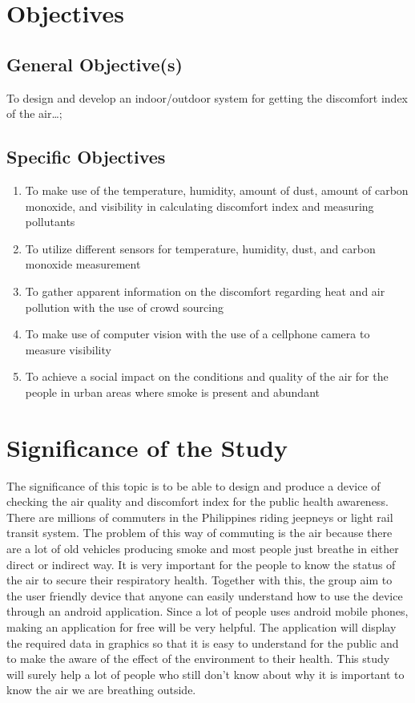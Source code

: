 \section{Objectives}
\subsection{General Objective(s)}
To design and develop an indoor/outdoor system for getting the discomfort index of the air\ldots;

\subsection{Specific Objectives}

\begin{enumerate}

	\item To make use of the temperature, humidity, amount of dust, amount of carbon monoxide, and visibility in calculating discomfort index and measuring pollutants

	\item To utilize different sensors for temperature, humidity, dust, and carbon monoxide measurement
	
	\item To gather apparent information on the discomfort regarding heat and air pollution with the use of crowd sourcing
	
	\item To make use of computer vision with the use of a cellphone camera to measure visibility 
	
	\item To achieve a social impact on the conditions and quality of the air for the people in urban areas where smoke is present and abundant
	
\end{enumerate}



\section{Significance of the Study}

The significance of this topic is to be able to design and produce a device of checking the air quality and discomfort index for the public health awareness. There are millions of commuters in the Philippines riding jeepneys or light rail transit system. The problem of this way of commuting is the air because there are a lot of old vehicles producing smoke and most people just breathe in either direct or indirect way. It is very important for the people to know the status of the air to secure their respiratory health. Together with this, the group aim to the user friendly device that anyone can easily understand how to use the device through an android application. Since a lot of people uses android mobile phones, making an application for free will be very helpful. The application will display the required data in graphics so that it is easy to understand for the public and to make the aware of the effect of the environment to their health. This study will surely help a lot of people who still don’t know about why it is important to know the air we are breathing outside.


